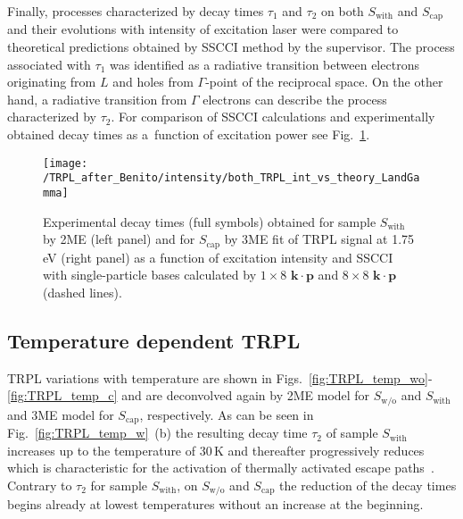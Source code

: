 Finally, processes characterized by decay times $\tau_1$ and $\tau_2$ on both $S_\mathrm{with}$ and $S_\mathrm{cap}$ and their evolutions with intensity of excitation laser were compared to theoretical predictions obtained by SSCCI method by the supervisor. The process associated with $\tau_1$ was identified as a radiative transition between electrons originating from $L$ and holes from $\Gamma$-point of the reciprocal space. On the other hand, a radiative transition from $\Gamma$ electrons can describe the process characterized by $\tau_2$. For comparison of SSCCI calculations and experimentally obtained decay times as a~function of excitation power see Fig.~\ref{fig:TRPL_int_c_theory}.
%
\begin{figure}
	\centering
	\texttt{[image: /TRPL\_after\_Benito/intensity/both\_TRPL\_int\_vs\_theory\_LandGamma]}
	\caption{Experimental decay times (full symbols) obtained for sample $S_\mathrm{with}$ by 2ME (left panel) and for $S_\mathrm{cap}$ by 3ME fit of TRPL signal at 1.75$\,$eV (right panel) as a function of excitation intensity and SSCCI with single-particle bases calculated by $1\times8$ $\mathbf{k\cdot p}$ and $8\times8$ $\mathbf{k\cdot p}$ (dashed lines).}
	\label{fig:TRPL_int_c_theory}
\end{figure}






\clearpage
\subsection{Temperature dependent TRPL}
\label{chap:TRPL_temp}
%
TRPL variations with temperature are shown in Figs.~\ref{fig:TRPL_temp_wo}-\ref{fig:TRPL_temp_c} and are deconvolved again by 2ME model for $S_\mathrm{w/o}$ and $S_\mathrm{with}$ and 3ME model for $S_\mathrm{cap}$, respectively. As can be seen in Fig.~\ref{fig:TRPL_temp_w}~(b) the resulting decay time $\tau_2$ of sample $S_\mathrm{with}$ increases up to the temperature of 30$\,$K and thereafter progressively reduces which is characteristic for the activation of thermally activated escape paths~\citep{Manna_apl2012_TRPLtype2}. Contrary to $\tau_2$ for sample $S_\mathrm{with}$, on $S_\mathrm{w/o}$ and $S_\mathrm{cap}$ the reduction of the decay times begins already at lowest temperatures without an increase at the beginning.

